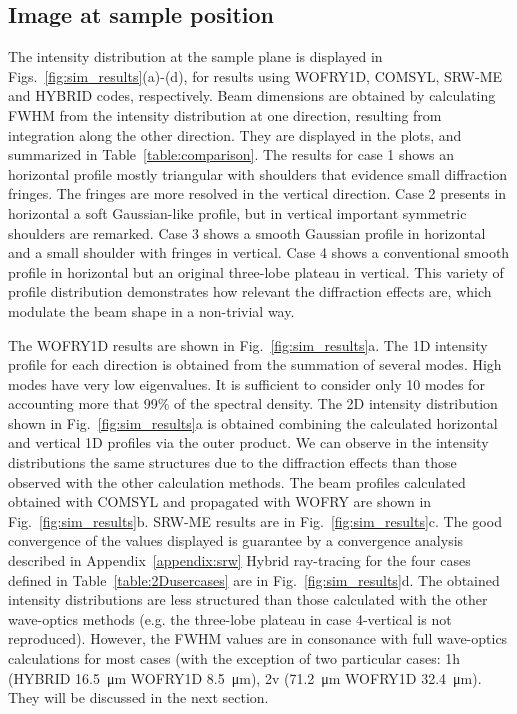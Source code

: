 \documentclass{iucr}              %
\begin{document}
\twocolumn

\subsection{Image at sample position}

The intensity distribution at the sample plane is displayed in Figs.~\ref{fig:sim_results}(a)-(d), for results using WOFRY1D, COMSYL, SRW-ME and HYBRID codes, respectively.  Beam dimensions are obtained by calculating FWHM from the intensity distribution at one direction, resulting from integration along the other direction. They are displayed in the plots, and summarized in Table~\ref{table:comparison}.
The results for case 1 shows an horizontal profile mostly triangular with shoulders that evidence small diffraction fringes. The fringes are more resolved in the vertical direction. Case 2  presents in horizontal a soft Gaussian-like profile, but in vertical important symmetric shoulders are remarked. Case 3 shows a smooth Gaussian profile in horizontal and a small shoulder with fringes in vertical. Case 4 shows a conventional smooth profile in horizontal but an original three-lobe plateau in vertical. This variety of profile distribution demonstrates how relevant the diffraction effects are, which modulate the beam shape in a non-trivial way.  

The WOFRY1D results are shown in Fig.~\ref{fig:sim_results}a. The 1D intensity profile for each direction is obtained from the summation of several modes. High modes have very low eigenvalues. It is sufficient to consider only 10 modes for accounting more that 99\% of the spectral density. The 2D intensity distribution shown in Fig.~\ref{fig:sim_results}a is obtained combining the calculated horizontal and vertical 1D profiles via the outer product. 
We can observe in the intensity distributions the same structures due to the diffraction effects than those observed with the other calculation methods.
The beam profiles calculated obtained with COMSYL and propagated with WOFRY are shown in Fig.~\ref{fig:sim_results}b. 
SRW-ME results are in Fig.~\ref{fig:sim_results}c. The good convergence of the values displayed is guarantee by a convergence analysis described in Appendix~\ref{appendix:srw}
Hybrid ray-tracing for the four cases defined in Table~\ref{table:2Dusercases} are in  Fig.~\ref{fig:sim_results}d. The obtained intensity distributions are less structured than those calculated with the other wave-optics methods (e.g. the three-lobe plateau in case 4-vertical is not reproduced). However, the FWHM values are in consonance with full wave-optics calculations for most cases (with the exception of two particular cases:
1h (HYBRID \SI{16.5}{\micro\meter} WOFRY1D \SI{8.5}{\micro\meter}),
2v (\SI{71.2}{\micro\meter} WOFRY1D \SI{32.4}{\micro\meter}). They will be discussed in the next section.
\end{document}
